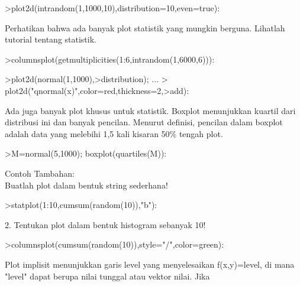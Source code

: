 \documentclass[12pt,arial,letterpaper]{book}
\begin{document}
\begin{eulercomment}
\begin{eulercomment}
\begin{eulercomment}
\begin{eulercomment}
\begin{eulercomment}
\begin{eulercomment}
\begin{eulercomment}
\begin{eulercomment}
\begin{eulercomment}
\begin{eulercomment}
\begin{eulercomment}
\begin{eulercomment}
\begin{eulercomment}
\begin{eulercomment}
\begin{eulercomment}
\begin{eulercomment}
\begin{eulerprompt}
>plot2d(intrandom(1,1000,10),distribution=10,even=true):
\end{eulerprompt}
\begin{eulercomment}
Perhatikan bahwa ada banyak plot statistik yang mungkin berguna.
Lihatlah tutorial tentang statistik.
\end{eulercomment}
\begin{eulerprompt}
>columnsplot(getmultiplicities(1:6,intrandom(1,6000,6))):
\end{eulerprompt}
\begin{eulerprompt}
>plot2d(normal(1,1000),>distribution); ...
>  plot2d("qnormal(x)",color=red,thickness=2,>add):
\end{eulerprompt}
\begin{eulercomment}
Ada juga banyak plot khusus untuk statistik. Boxplot menunjukkan
kuartil dari distribusi ini dan banyak pencilan. Menurut definisi,
pencilan dalam boxplot adalah data yang melebihi 1,5 kali kisaran 50\%
tengah plot.
\end{eulercomment}
\begin{eulerprompt}
>M=normal(5,1000); boxplot(quartiles(M)):
\end{eulerprompt}
\begin{eulercomment}
Contoh Tambahan:\\
Buatlah plot dalam bentuk string sederhana!
\end{eulercomment}
\begin{eulerprompt}
>statplot(1:10,cumsum(random(10)),"b"):
\end{eulerprompt}
\begin{eulercomment}
2. Tentukan plot dalam bentuk histogram sebanyak 10!
\end{eulercomment}
\begin{eulerprompt}
>columnsplot(cumsum(random(10)),style="/",color=green):
\end{eulerprompt}
\begin{eulercomment}
Plot implisit menunjukkan garis level yang menyelesaikan f(x,y)=level,
di mana "level" dapat berupa nilai tunggal atau vektor nilai. Jika

\end{eulercomment}
\end{eulercomment}
\end{eulercomment}
\end{eulercomment}
\end{eulercomment}
\end{eulercomment}
\end{eulercomment}
\end{eulercomment}
\end{eulercomment}
\end{eulercomment}
\end{eulercomment}
\end{eulercomment}
\end{eulercomment}
\end{eulercomment}
\end{eulercomment}
\end{eulercomment}
\end{eulercomment}
\end{document}
